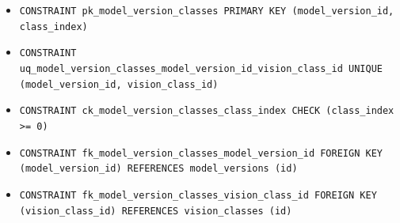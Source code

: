 \begin{itemize}
\item \raggedright {\small\texttt{CONSTRAINT pk\_\allowbreak{}\allowbreak{}model\_\allowbreak{}\allowbreak{}version\_\allowbreak{}\allowbreak{}classes PRIMARY KEY (model\_\allowbreak{}\allowbreak{}version\_\allowbreak{}\allowbreak{}id, class\_\allowbreak{}\allowbreak{}index)}}
\item \raggedright {\small\texttt{CONSTRAINT uq\_\allowbreak{}\allowbreak{}model\_\allowbreak{}\allowbreak{}version\_\allowbreak{}\allowbreak{}classes\_\allowbreak{}\allowbreak{}model\_\allowbreak{}\allowbreak{}version\_\allowbreak{}\allowbreak{}id\_\allowbreak{}\allowbreak{}vision\_\allowbreak{}\allowbreak{}class\_\allowbreak{}\allowbreak{}id UNIQUE (model\_\allowbreak{}\allowbreak{}version\_\allowbreak{}\allowbreak{}id, vision\_\allowbreak{}\allowbreak{}class\_\allowbreak{}\allowbreak{}id)}}
\item \raggedright {\small\texttt{CONSTRAINT ck\_\allowbreak{}\allowbreak{}model\_\allowbreak{}\allowbreak{}version\_\allowbreak{}\allowbreak{}classes\_\allowbreak{}\allowbreak{}class\_\allowbreak{}\allowbreak{}index CHECK (class\_\allowbreak{}\allowbreak{}index >= 0)}}
\item \raggedright {\small\texttt{CONSTRAINT fk\_\allowbreak{}\allowbreak{}model\_\allowbreak{}\allowbreak{}version\_\allowbreak{}\allowbreak{}classes\_\allowbreak{}\allowbreak{}model\_\allowbreak{}\allowbreak{}version\_\allowbreak{}\allowbreak{}id FOREIGN KEY (model\_\allowbreak{}\allowbreak{}version\_\allowbreak{}\allowbreak{}id) REFERENCES model\_\allowbreak{}\allowbreak{}versions (id)}}
\item \raggedright {\small\texttt{CONSTRAINT fk\_\allowbreak{}\allowbreak{}model\_\allowbreak{}\allowbreak{}version\_\allowbreak{}\allowbreak{}classes\_\allowbreak{}\allowbreak{}vision\_\allowbreak{}\allowbreak{}class\_\allowbreak{}\allowbreak{}id FOREIGN KEY (vision\_\allowbreak{}\allowbreak{}class\_\allowbreak{}\allowbreak{}id) REFERENCES vision\_\allowbreak{}\allowbreak{}classes (id)}}
\end{itemize}
